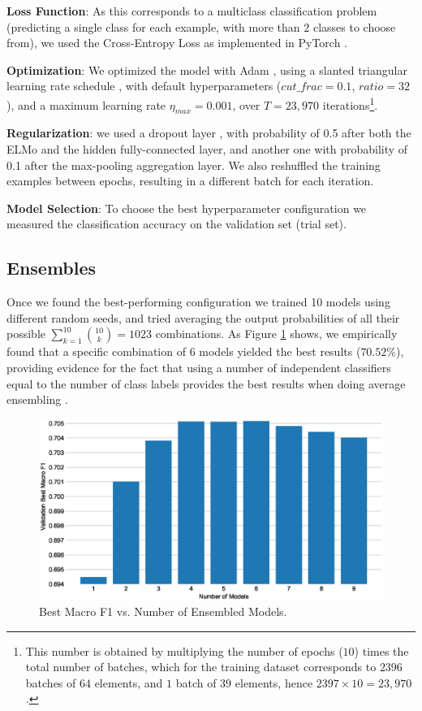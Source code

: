 \documentclass[11pt,a4paper]{article}
\begin{document}
\textbf{Loss Function}: As this corresponds to a multiclass classification problem (predicting a single class for each example, with more than 2 classes to choose from), we used the Cross-Entropy Loss as implemented in PyTorch \cite{paszke2017automatic}.

\textbf{Optimization}: We optimized the model with Adam \cite{DBLP:journals/corr/KingmaB14}, using a slanted triangular learning rate schedule \cite{howard2018universal}, with default hyperparameters ($cut\_frac=0.1$, $ratio=32$), and a maximum learning rate $\eta_{max}=0.001$, over $T=23,970$ iterations\footnote{This number is obtained by multiplying the number of epochs ($10$) times the total number of batches, which for the training dataset corresponds to $2396$ batches of $64$ elements, and $1$ batch of $39$ elements, hence $2397\times10=23,970$.}.

\textbf{Regularization}: we used a dropout layer \cite{srivastava2014dropout}, with probability of 0.5 after both the ELMo and the hidden fully-connected layer, and another one with probability of 0.1 after the max-pooling aggregation layer. We also reshuffled the training examples between epochs, resulting in a different batch for each iteration. 

\textbf{Model Selection}: To choose the best hyperparameter configuration we measured the classification accuracy on the validation set (trial set). 


\subsection{Ensembles}
 
Once we found the best-performing configuration we trained 10 models using different random seeds, and tried averaging the output probabilities of all their possible $\sum_{k=1}^{10}{\binom{10}{k}}=1023$ combinations. As Figure \ref{fig:best_ensembles} shows, we empirically found that a specific combination of $6$ models yielded the best results ($70.52\%$), providing evidence for the fact that using a number of independent classifiers equal to the number of class labels provides the best results when doing average ensembling \cite{bonab2016theoretical}.


\begin{figure}[!h]
    \centering
    \includegraphics[width=\columnwidth]{images/best_ensembles.eps}
\caption{Best Macro F1 vs. Number of Ensembled Models.}
\label{fig:best_ensembles}
\end{figure}
\end{document}
